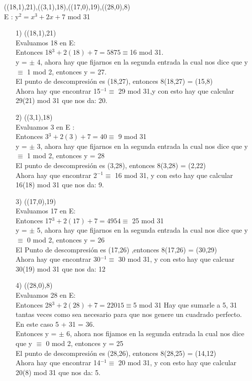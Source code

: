 \documentclass[10pt,a4paper]{article}
\begin{document}
\begin{enumerate}
\begin{itemize}
((18,1),21),((3,1),18),((17,0),19),((28,0),8)\\
E : y$^{2} = x^{3} + 2x + 7$ mod 31
\begin{itemize}
\item[1)] ((18,1),21)\\
Evaluamos 18 en E:\\
Entonces 18$^{3} +2(18) + 7 = 5875 \equiv $16 mod 31.\\
y = $\pm$ 4, ahora hay que fijarnos en la segunda entrada la cual nos dice que y $\equiv$ 1 mod 2, entonces y = 27.\\
El punto de descompresión es (18,27), entonces 8(18,27) = (15,8)\\
Ahora hay que encontrar 15$^{-1} \equiv $ 29 mod 31,y con esto hay que calcular 29(21) mod 31 que nos da: 20.
\item[2)] ((3,1),18)\\
Evaluamos 3 en E :\\
Entonces 3$^{3} + 2(3) + 7 = 40 \equiv $ 9 mod 31\\
y = $\pm$ 3, ahora hay que fijarnos en la segunda entrada la cual nos dice que y $\equiv$ 1 mod 2, entonces y = 28 \\ 
El punto de descompresión es (3,28), entonces 8(3,28) = (2,22)\\
Ahora hay que encontrar 2$^{-1} \equiv$ 16 mod 31, y con esto hay que calcular 16(18) mod 31 que nos da: 9.
\item[3)] ((17,0),19)\\
Evaluamos 17 en E:\\
Entonces 17$^{3} + 2(17) + 7 = 4954 \equiv$ 25 mod 31\\
y = $\pm$ 5, ahora hay que fijarnos en la segunda entrada la cual nos dice que y $\equiv$ 0 mod 2, entonces y = 26\\
El Punto de descompresión es (17,26) ,entonces 8(17,26) = (30,29)\\
Ahora hay que encontrar 30$^{-1} \equiv$ 30 mod 31, y con esto hay que calcuar 30(19) mod 31 que nos da: 12 %
\item[4)] ((28,0),8) \\
Evaluamos 28 en E:\\
Entonces 28$^{3} + 2(28) + 7 = 22015 \equiv $5 mod 31
Hay que sumarle a 5, 31 tantas veces como sea necesario para que nos genere un cuadrado perfecto. En este caso 5 + 31 = 36.\\
Entonces y = $\pm$ 6, ahora nos fijamos en la segunda entrada la cual nos dice que y $\equiv$ 0 mod 2, entonces  y = 25\\
El punto de descompresión es (28,26), entonces 8(28,25) = (14,12)\\
Ahora hay que encontrar 14$^{-1} \equiv$ 20 mod 31, y con esto hay que calcular 20(8) mod 31 que nos da: 5.



\end{itemize}
\end{itemize}
\end{enumerate}
\end{document}
